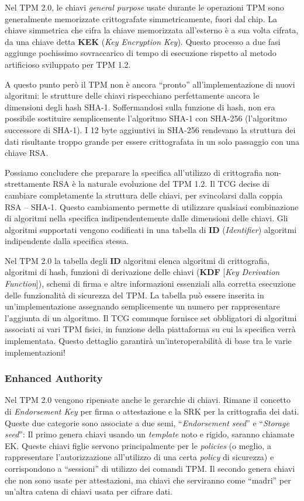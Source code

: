 Nel TPM 2.0, le chiavi \textit{general purpose} usate durante le operazioni TPM sono generalmente memorizzate crittografate simmetricamente, fuori dal chip. La chiave simmetrica che cifra la chiave memorizzata all’esterno è a sua volta cifrata, da una chiave detta \textbf{KEK} (\textit{Key Encryption Key}). Questo processo a due fasi aggiunge pochissimo sovraccarico di tempo di esecuzione rispetto al metodo artificioso sviluppato per TPM 1.2.

A questo punto però il TPM non è ancora “pronto” all’implementazione di nuovi algoritmi: le strutture delle chiavi rispecchiano perfettamente ancora le dimensioni degli hash SHA-1. Soffermandosi sulla funzione di hash, non era possibile sostituire semplicemente l'algoritmo SHA-1 con SHA-256 (l’algoritmo successore di SHA-1). I 12 byte aggiuntivi in SHA-256 rendevano la struttura dei dati risultante troppo grande per essere crittografata in un solo passaggio con una chiave RSA.

Possiamo concludere che preparare la specifica all’utilizzo di crittografia non-strettamente RSA è la naturale evoluzione del TPM 1.2. Il TCG decise di cambiare completamente la struttura delle chiavi, per svincolarsi dalla coppia RSA -- SHA-1.
Questo cambiamento permette di utilizzare qualsiasi combinazione di algoritmi nella specifica indipendentemente dalle dimensioni delle chiavi. Gli algoritmi supportati vengono codificati in una tabella di \textbf{ID} (\textit{Identifier}) algoritmi indipendente dalla specifica stessa. 

Nel TPM 2.0 la tabella degli \textbf{ID} algoritmi elenca algoritmi di crittografia, algoritmi di hash, funzioni di derivazione delle chiavi (\textbf{KDF} [\textit{Key Derivation Function}]), schemi di firma e altre informazioni essenziali alla corretta esecuzione delle funzionalità di sicurezza del TPM. La tabella può essere inserita in un’implementazione assegnando semplicemente un numero per rappresentare l’aggiunta di un algoritmo. Il TCG comunque fornisce set obbligatori di algoritmi associati ai vari TPM fisici, in funzione della piattaforma su cui la specifica verrà implementata. Questo dettaglio garantirà un'interoperabilità di base tra le varie implementazioni! 

\subsubsection{Enhanced Authority}
Nel TPM 2.0 vengono ripensate anche le gerarchie di chiavi. Rimane il concetto di \textit{Endorsement Key} per firma o attestazione e la SRK per la crittografia dei dati. Queste due categorie sono associate a due semi, “\textit{Endorsement seed}” e “\textit{Storage seed}”:
Il primo genera chiavi usando un \textit{template} noto e rigido, saranno chiamate EK. Queste chiavi figlie servono principalmente per le \textit{policies} (o meglio, a rappresentare l’autorizzazione all’utilizzo di una certa \textit{policy} di sicurezza) e corrispondono a “sessioni” di utilizzo dei comandi TPM.
Il secondo genera chiavi che non sono usate per attestazioni, ma chiavi che serviranno come “madri” per un’altra catena di chiavi usata per cifrare dati.

